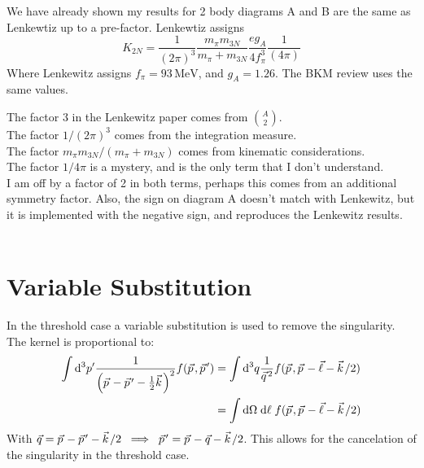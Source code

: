 \documentclass[11pt]{article}
\newcommand\ddfrac[2]{\frac{\displaystyle #1}{\displaystyle #2}}
\newcommand{\vectorwithspace}[1]{\vec{#1}\mkern2mu\vphantom{#1}}
\newcommand{\kv}{\vectorwithspace{k}}
\newcommand{\pv}{\vectorwithspace{p}}
\newcommand{\qv}{\vectorwithspace{q}}
\newcommand{\ga}{\ensuremath{g_A}}
\newcommand{\dd}{\mathrm{d}}
\newcommand{\MeV}{\,\mathrm{MeV}}
\newcommand{\ppv}{{\pv'}}
\begin{document}
We have already shown my results for 2 body diagrams A and B are the
same as Lenkewtiz up to a pre-factor. Lenkewtiz assigns
\begin{equation}
	K_{2N}= \frac{1}{(2\pi)^3} \ddfrac{m_\pi m_{3N}}{m_\pi+m_{3N}}
	\ddfrac{ e \ga}{4  f_\pi^3} \frac{1}{(4\pi)}
\end{equation}
Where Lenkewitz assigns $f_\pi= 93 \MeV$, and $g_A=1.26$. The BKM
review uses the same values.\par

The factor $3$ in the Lenkewitz paper comes from $\binom{A}{2}$.\\
The factor $1/(2\pi)^3$ comes from the integration measure.\\
The factor $m_\pi m_{3N}/(m_\pi+m_{3N})$ comes from kinematic considerations.\\
The factor $1/4\pi$ is a mystery, and is the  only term that I don't understand.~\\


I am off by a factor of 2 in both terms, perhaps this comes from an additional symmetry factor. Also, the sign on
diagram A doesn't match with Lenkewitz, but it is implemented with the negative sign, and reproduces the Lenkewitz
results.
~\\~\\

\section{Variable Substitution}
In the threshold case a variable substitution is used to remove the singularity. The kernel is proportional to:
\begin{align}
	\int \dd^3 p^\prime \frac{1}{
		\left( \pv -\pv^\prime - \frac{1}{2} \kv  \right)^2
	} f(\pv, \ppv)
	 & = \int \dd^3 q \frac{1}{\qv^2} f(\pv,\pv -\vec{\ell}- \kv/2) \\
	 & = \int \dd \Omega\; \dd \ell\;  f(\pv,\pv -\vec{\ell}- \kv/2)
\end{align}
With $\vec{q}=\pv-\ppv-\kv/2 \;\implies\; \ppv=\pv -\vec{q}- \kv/2 $.
This allows for the cancelation of the singularity in the threshold case.\\~\\
\end{document}
